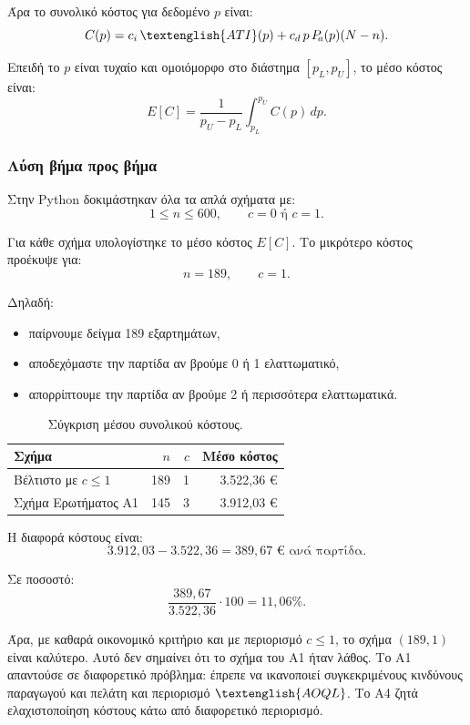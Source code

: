 \documentclass[12pt,a4paper]{article}
\newcommand{\Pa}{P_{\!a}}
\newcommand{\AOQL}{\textenglish{AOQL}}
\newcommand{\ATI}{\textenglish{ATI}}
\begin{document}
Άρα το συνολικό κόστος για δεδομένο \(p\) είναι:
\[
    C(p)=c_i\,\ATI(p)+c_d\,p\,\Pa(p)(N-n).
\]

Επειδή το \(p\) είναι τυχαίο και ομοιόμορφο στο διάστημα \([p_L,p_U]\), το
μέσο κόστος είναι:
\[
    E[C]=\frac{1}{p_U-p_L}
    \int_{p_L}^{p_U}C(p)\,dp.
\]

\subsubsection*{Λύση βήμα προς βήμα}

Στην Python δοκιμάστηκαν όλα τα απλά σχήματα με:
\[
    1\le n\le 600,\qquad c=0 \text{ ή } c=1.
\]

Για κάθε σχήμα υπολογίστηκε το μέσο κόστος \(E[C]\). Το μικρότερο κόστος
προέκυψε για:
\[
    \boxed{n=189,\qquad c=1}.
\]

Δηλαδή:

\begin{itemize}
    \item παίρνουμε δείγμα 189 εξαρτημάτων,
    \item αποδεχόμαστε την παρτίδα αν βρούμε 0 ή 1 ελαττωματικό,
    \item απορρίπτουμε την παρτίδα αν βρούμε 2 ή περισσότερα ελαττωματικά.
\end{itemize}

\begin{table}[H]
\centering
\caption{Σύγκριση μέσου συνολικού κόστους.}
\begin{tabular}{lrrr}
\toprule
\textbf{Σχήμα} & \textbf{\(n\)} & \textbf{\(c\)} & \textbf{Μέσο κόστος} \\
\midrule
Βέλτιστο με \(c\le 1\) & 189 & 1 & 3.522,36 € \\
Σχήμα Ερωτήματος Α1 & 145 & 3 & 3.912,03 € \\
\bottomrule
\end{tabular}
\end{table}

Η διαφορά κόστους είναι:
\[
    3.912{,}03-3.522{,}36=389{,}67 \text{ € ανά παρτίδα}.
\]

Σε ποσοστό:
\[
    \frac{389{,}67}{3.522{,}36}\cdot 100=11{,}06\%.
\]

Άρα, με καθαρά οικονομικό κριτήριο και με περιορισμό \(c\le 1\), το σχήμα
\((189,1)\) είναι καλύτερο. Αυτό δεν σημαίνει ότι το σχήμα του Α1 ήταν λάθος.
Το Α1 απαντούσε σε διαφορετικό πρόβλημα: έπρεπε να ικανοποιεί συγκεκριμένους
κινδύνους παραγωγού και πελάτη και περιορισμό \(\AOQL\). Το Α4 ζητά
ελαχιστοποίηση κόστους κάτω από διαφορετικό περιορισμό.
\end{document}
